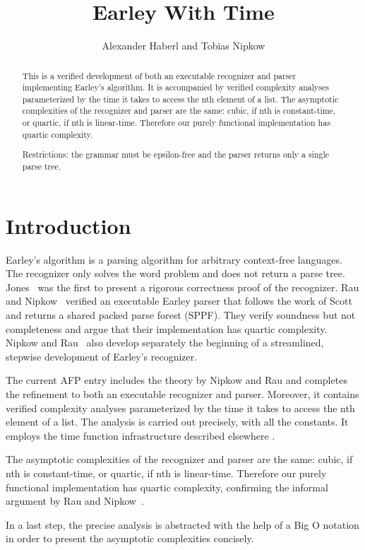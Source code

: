 \documentclass[11pt,a4paper]{article}
\begin{document}
\title{Earley With Time}
\author{Alexander Haberl and Tobias Nipkow}
\maketitle

\begin{abstract}
This is a verified development of both an executable recognizer and parser
implementing Earley's algorithm. It is accompanied by verified complexity
analyses parameterized by the time it takes to access the nth element of a list.
The asymptotic complexities of the recognizer and parser are the same:
cubic, if nth is constant-time, or quartic, if nth is linear-time.
Therefore our purely functional implementation has quartic complexity. 

Restrictions: the grammar must be epsilon-free and the parser returns only
a single parse tree.
\end{abstract}

\newpage
\tableofcontents

\newpage
\section{Introduction}

Earley's algorithm \cite{Earley-CACM} is a parsing algorithm for arbitrary context-free
languages. The recognizer only solves the word problem and does not return a parse tree.
Jones~\cite{Jones} was the first to present a rigorous correctness proof of the recognizer.
Rau and Nipkow~\cite{RauN-ITP24} verified an executable Earley parser that follows the work
of Scott~\cite{Scott-ENTCS08} and returns a shared packed parse forest (SPPF).
They verify soundness but not completeness and argue that their implementation has quartic complexity.
Nipkow and Rau~\cite{NipkowR-CBJ24} also develop separately the beginning
of a streamlined, stepwise development of Earley's recognizer.

The current AFP entry includes the theory by Nipkow and Rau
and completes the refinement to both an executable recognizer and parser.
Moreover, it contains verified complexity analyses
parameterized by the time it takes to access the nth element of a list.
The analysis is carried out precisely, with all the constants.
It employs the time function infrastructure described elsewhere \cite{Nipkow-ACMbook}.

The asymptotic complexities of the recognizer and parser are the same:
cubic, if nth is constant-time, or quartic, if nth is linear-time.
Therefore our purely functional implementation has quartic complexity,
confirming the informal argument by Rau and Nipkow~\cite{RauN-ITP24}.

In a last step, the precise analysis is abstracted with the help of a Big O notation
in order to present the asymptotic complexities concisely.

\newpage


\newpage


\end{document}
